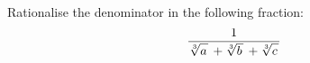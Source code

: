 Rationalise the denominator in the following fraction:
\begin{equation*}
  \frac{1}{ \mspace{1mu}
    \sqrt[3]{a \vphantom{b c} \mspace{2mu}} \,
    + \sqrt[3]{b \vphantom{a c} \mspace{2mu}} \,
    + \sqrt[3]{c \vphantom{a b} \mspace{2mu}}
  \mspace{1mu} }
\end{equation*}
